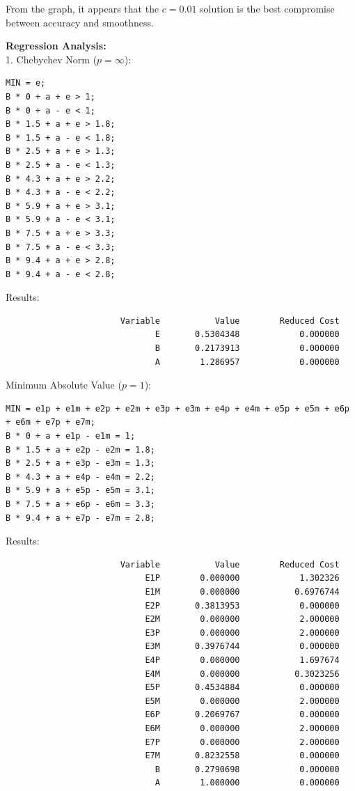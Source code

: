 \documentclass{article}
\begin{document}
From the graph, it appears that the $c = 0.01$ solution is the best compromise between accuracy and smoothness.

\newpage

\textbf{Regression Analysis:} \\

1. Chebychev Norm ($p = \infty$):

\begin{verbatim}
MIN = e;
B * 0 + a + e > 1;
B * 0 + a - e < 1;
B * 1.5 + a + e > 1.8;
B * 1.5 + a - e < 1.8;
B * 2.5 + a + e > 1.3;
B * 2.5 + a - e < 1.3;
B * 4.3 + a + e > 2.2;
B * 4.3 + a - e < 2.2;
B * 5.9 + a + e > 3.1;
B * 5.9 + a - e < 3.1;
B * 7.5 + a + e > 3.3;
B * 7.5 + a - e < 3.3;
B * 9.4 + a + e > 2.8;
B * 9.4 + a - e < 2.8;
\end{verbatim}

Results:

\begin{verbatim}
                       Variable           Value        Reduced Cost
                              E       0.5304348            0.000000
                              B       0.2173913            0.000000
                              A        1.286957            0.000000
\end{verbatim}

Minimum Absolute Value ($p = 1$):

\begin{verbatim}
MIN = e1p + e1m + e2p + e2m + e3p + e3m + e4p + e4m + e5p + e5m + e6p + e6m + e7p + e7m;
B * 0 + a + e1p - e1m = 1;
B * 1.5 + a + e2p - e2m = 1.8;
B * 2.5 + a + e3p - e3m = 1.3;
B * 4.3 + a + e4p - e4m = 2.2;
B * 5.9 + a + e5p - e5m = 3.1;
B * 7.5 + a + e6p - e6m = 3.3;
B * 9.4 + a + e7p - e7m = 2.8;
\end{verbatim}

Results:

\begin{verbatim}
                       Variable           Value        Reduced Cost
                            E1P        0.000000            1.302326
                            E1M        0.000000           0.6976744
                            E2P       0.3813953            0.000000
                            E2M        0.000000            2.000000
                            E3P        0.000000            2.000000
                            E3M       0.3976744            0.000000
                            E4P        0.000000            1.697674
                            E4M        0.000000           0.3023256
                            E5P       0.4534884            0.000000
                            E5M        0.000000            2.000000
                            E6P       0.2069767            0.000000
                            E6M        0.000000            2.000000
                            E7P        0.000000            2.000000
                            E7M       0.8232558            0.000000
                              B       0.2790698            0.000000
                              A        1.000000            0.000000
\end{verbatim}
\end{document}
